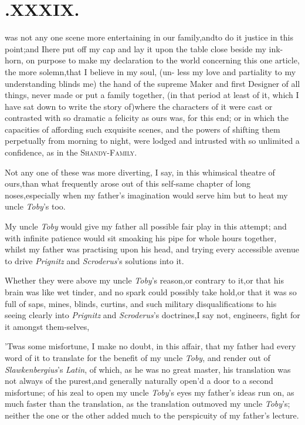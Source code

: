 \documentclass{article}
\begin{document}
\section{.\quad  XXXIX.}

 was not any one scene more
entertaining in our family,\tsk and\break to do it justice in this
point;\tsh and I\break here put off my cap and lay it upon the\break
table close beside my ink-horn, on purpose to make my declaration
to the world concerning this one article, the more
so\-lemn,\tsh that I believe in my soul, (un- less my love and
partiality to my understanding blinds me) the hand of the su\-preme
Maker and first Designer of all things, never made or put a family
toge\-ther, (in that period at least of it, which I have sat down to
write the story of)\tsh where the characters of it were cast
or contrasted with so dramatic a felicity as ours was, for this
end; or in which the\break
capacities of affording such exquisite\break
scenes, and the powers of shifting them perpetually from morning to night,
were lodged and intrusted with so unlimited a confidence, as in the
\textsc{Shandy-Family}.

Not any one of these was more diverting, I say, in this
whimsical theatre of ours,\tsk than what frequently arose
out of this self-same chapter of long noses,\tsh especially
when my father’s imagination  would serve him but to heat my uncle \textit{Toby}’s
too.

My uncle \textit{Toby} would give my father all possible fair play
in this attempt; and with infinite patience would sit smoaking his
pipe for whole hours together, whilst my father was practising upon
his head, and trying every accessible avenue to drive
\textit{Prignitz} and \textit{Scroderus}’s solutions into it.

Whether they were above my uncle \textit{Toby}’s
reason,\tsh or contrary to it,\tsh or that his brain was like wet
tinder, and no spark could possibly take hold,\tsh or that
it was so full of saps, mines, blinds, curtins, and such military
disqualifications to his seeing clearly into \textit{Prignitz} and
\textit{Scroderus}’s doctrines,\tsk I say not,\tsk 
{} 
engineers, fight for it amongst them-\break selves,\tsh

’Twas some misfortune, I make no\break
doubt, in this affair,
that my father had every word of it to translate for the bene\-fit of
my uncle \textit{Toby}, and render out of
\textit{Slawkenbergius}’s \textit{Latin}, of which, as he was no
great master, his translation was not always of the
purest,\tsk and generally\break {} naturally open’d a door to a second
misfortune;\tsk {}\break
of his zeal to open my uncle \textit{Toby}’s eyes\break
\tsh my father’s ideas run on, as much faster than the translation, as
the translation outmoved my uncle
\textit{Toby}’s;\tsh\break
neither the one or the other added much\break
to the perspicuity of my father’s lecture.
\end{document}
